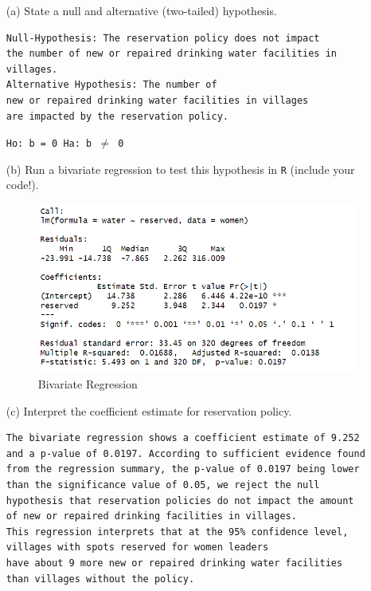 \documentclass[12pt,letterpaper]{article}
\begin{document}
\newpage
\begin{enumerate}
	\item [(a)] State a null and alternative (two-tailed) hypothesis. 
\begin{Verbatim}
Null-Hypothesis: The reservation policy does not impact 
the number of new or repaired drinking water facilities in villages.
Alternative Hypothesis: The number of
new or repaired drinking water facilities in villages 
are impacted by the reservation policy. 
\end{Verbatim}
\texttt{Ho: b = 0  Ha: b $\neq$ 0}

\item [(b)]Run a bivariate regression to test this hypothesis in \texttt{R} (include your code!).
\begin{figure}[h!]\centering
	\caption{\footnotesize Bivariate Regression}
	\label{fig:bireg}
	\includegraphics[width=.85\textwidth]{bireg.png}
\end{figure}
  
\item [(c)] Interpret the coefficient estimate for reservation policy. 
\begin{Verbatim}
The bivariate regression shows a coefficient estimate of 9.252 
and a p-value of 0.0197. According to sufficient evidence found 
from the regression summary, the p-value of 0.0197 being lower
than the significance value of 0.05, we reject the null
hypothesis that reservation policies do not impact the amount 
of new or repaired drinking facilities in villages.
This regression interprets that at the 95% confidence level, 
villages with spots reserved for women leaders
have about 9 more new or repaired drinking water facilities 
than villages without the policy. 
\end{Verbatim}
\end{enumerate}
\end{document}
